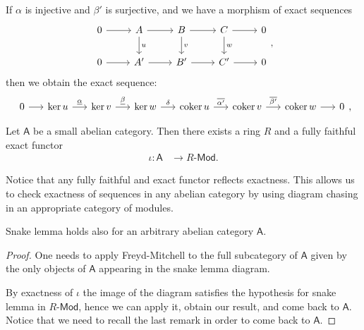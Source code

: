 \documentclass[../Main]{subfiles}
\begin{document}
\begin{rem}[]
	If $\alpha$ is injective and $\beta'$ is surjective, and we have a morphism of exact sequences
	\begin{equation}
	\begin{tikzcd}
		0 \arrow[r, "", rightarrow] &
		A \arrow[r, "", rightarrow] \arrow[d, "u", rightarrow] &
		B \arrow[r, "", rightarrow] \arrow[d, "v", rightarrow] &
		C \arrow[r, "", rightarrow] \arrow[d, "w", rightarrow] &
		0 \\
		0 \arrow[r, "", rightarrow] &
		A' \arrow[r, "", rightarrow] &
		B' \arrow[r, "", rightarrow] &
		C' \arrow[r, "", rightarrow] &
		0
	\end{tikzcd}
	,\end{equation} 
	then we obtain the exact sequence:
	\begin{equation}
	\begin{tikzcd}[column sep=1.5em]
		0 \arrow[r, "", rightarrow] &
		\ker u \arrow[r, "\underline{\alpha}", rightarrow] &
		\ker v \arrow[r, "\underline{\beta}", rightarrow] &
		\ker w \arrow[r, "\delta", rightarrow] &
		\mathrm{coker}\, u \arrow[r, "\overline{\alpha'}", rightarrow] &
		\mathrm{coker}\, v \arrow[r, "\overline{\beta'}", rightarrow] &
		\mathrm{coker}\, w \arrow[r, "", rightarrow] &
		0
	\end{tikzcd}
	,\end{equation} 
\end{rem}

\begin{thm}
	Let $\mathsf{A}$ be a small abelian category.
	Then there exists a ring $R$ and a fully faithful exact functor
	\begin{align}
		\iota\colon \mathsf{A} &\longrightarrow R\text{-}\mathsf{Mod}
	.\end{align} 
\end{thm}

\begin{rem}[]
	Notice that any fully faithful and exact functor reflects exactness.
	This allows us to check exactness of sequences in any abelian category
	by using diagram chasing in an appropriate category of modules.
\end{rem}

\begin{cor}
	Snake lemma holds also for an arbitrary abelian category $\mathsf{A}$.
\end{cor} 
\begin{proof}
	One needs to apply Freyd-Mitchell to the full subcategory of $\mathsf{A}$
	given by the only objects of $\mathsf{A}$ appearing in the snake lemma diagram.

	By exactness of $\iota$ the image of the diagram satisfies the hypothesis for snake
	lemma in $R\text{-}\mathsf{Mod}$, hence we can apply it, 
	obtain our result, and come back to $\mathsf{A}$.
	Notice that we need to recall the last remark in order to come back
	to $\mathsf{A}$.
\end{proof}
\end{document}
